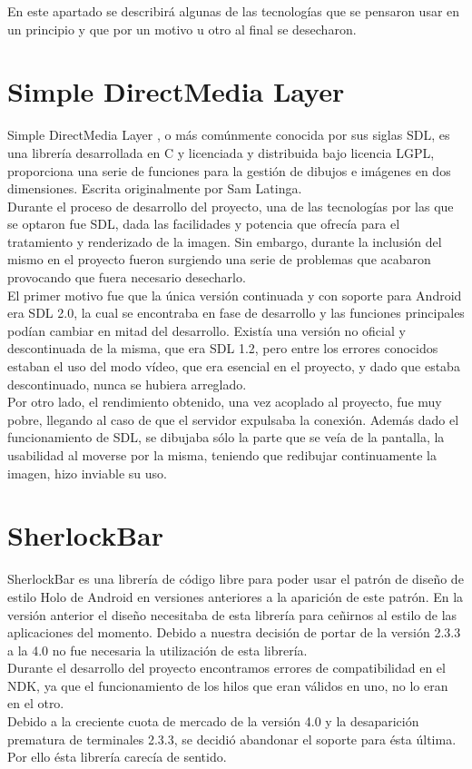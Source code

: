 En este apartado se describirá algunas de las tecnologías que se pensaron usar en un principio y que por un motivo u otro al final se desecharon.

\section{Simple DirectMedia Layer}

Simple DirectMedia Layer \cite{sdl:sdl}\cite{sdl2:sdl2}, o más comúnmente conocida por sus siglas SDL, es una librería desarrollada en C y licenciada y distribuida bajo licencia LGPL, proporciona una serie de funciones para la gestión de dibujos e imágenes en dos dimensiones. Escrita originalmente por Sam Latinga.\\

Durante el proceso de desarrollo del proyecto, una de las tecnologías por las que se optaron fue SDL, dada las facilidades y potencia que ofrecía para el tratamiento y renderizado de la imagen. Sin embargo, durante la inclusión del mismo en el proyecto fueron surgiendo una serie de problemas que acabaron provocando que fuera necesario desecharlo.\\

El primer motivo fue que la única versión continuada y con soporte para Android era SDL 2.0, la cual se encontraba en fase de desarrollo y las funciones principales podían cambiar en mitad del desarrollo. Existía una versión no oficial y descontinuada de la misma, que era SDL 1.2, pero entre los errores conocidos estaban el uso del modo vídeo, que era esencial en el proyecto, y dado que estaba descontinuado, nunca se hubiera arreglado.\\

Por otro lado, el rendimiento obtenido, una vez acoplado al proyecto, fue muy pobre, llegando al caso de que el servidor expulsaba la conexión. Además dado el funcionamiento de SDL, se dibujaba sólo la parte que se veía de la pantalla, la usabilidad al moverse por la misma, teniendo que redibujar continuamente la imagen, hizo inviable su uso.
\newpage
\section{SherlockBar}

SherlockBar\cite{sherlock:sherlock} es una librería de código libre para poder usar el patrón de diseño de estilo Holo de Android en versiones anteriores a la aparición de este patrón. En la versión anterior el diseño necesitaba de esta librería para ceñirnos al estilo de las aplicaciones del momento. Debido a nuestra decisión de portar de la versión 2.3.3 a la 4.0 no fue necesaria la utilización de esta librería.\\

Durante el desarrollo del proyecto encontramos errores de compatibilidad en el NDK, ya que el funcionamiento de los hilos que eran válidos en uno, no lo eran en el otro.\\

Debido a la creciente cuota de mercado de la versión 4.0 y la desaparición prematura de terminales 2.3.3, se decidió abandonar el soporte para ésta última. Por ello ésta librería carecía de sentido. 
